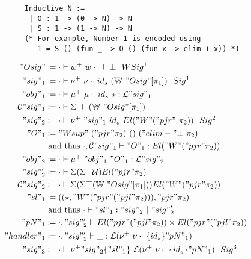 \begin{figure}
  \begin{minipage}{\linewidth}
    \begin{verbatim}
      Inductive N :=
       | O : 1 -> (0 -> N) -> N 
       | S : 1 -> (1 -> N) -> N
      (* For example, Number 1 is encoded using
         1 = S () (fun _ -> O () (fun x -> elim-⊥ x)) *)
    \end{verbatim}
  \end{minipage}

  \begin{minipage}[t]{0.4\linewidth}
  \small
\begin{align*}
  "Osig" &\coloneqq \goodWSig{\cdot}{w^+\ w\cdot\ \top\ \bot}{1} \\
  "sig"_1 &\coloneqq \goodSig{\cdot}{\nu^+ \ \nu\cdot \ {id_s} \ (\bW \ "Osig"[\pi_1])}{1}  \\
  "obj"_1 &\coloneqq \goodTerm{\cdot}{\mu^+ \ \mu\cdot \ {id_s} \ \star}{\cL"sig"_1}\\
  \cC"sig"_1 &\coloneqq \goodType{\cdot}{\Sigma \ \top \ (\bW \ "Osig"[\pi_1]) }{} \\
  "sig"_2 &\coloneqq  \goodSig{\cdot}{\nu^+ \ "sig"_1 \ {id_s} \ El ("W" ("pjr" \ \pi_2))}{2} \\ 
  "O"_1 &\coloneqq {"Wsup" \ ("pjr" \pi_2) \ () \ ("elim-"\bot \ \pi_2)}  \\ 
  & \text{ and thus }  \goodTerm{\cdot, \cC"sig"_1}{"O"_1}{El ("W" ("pjr" \pi_2))} \\
  "obj"_2 &\coloneqq \goodTerm{\cdot}{\mu^+ \ "obj"_1 \ "O"_1}{\cL"sig"_2} \\
  "sig"_2' &\coloneqq \goodType{\cdot}{\Sigma (\Sigma \top \cU)El ("pjr" \pi_2)}{} \\ 
  \cC"sig"_2 &\coloneqq \goodType{\cdot}{\Sigma (\Sigma \top (\bW \ "Osig"[\pi_1]))El ("W"("pjr" \pi_2)) }{} \\ 
  "sl"_1 &\coloneqq ((\star, "W" ("pjr" ("pjl" \pi_2)) ), "pjr" \pi_2) \\ 
  & \text{ and thus }  \goodSeal{\cdot}{"sl"_1}{"sig"_2}{"sig"_2'} \\
  "pN"_1 &\coloneqq \goodType{\cdot, "sig"_2'}{El ("pjr" ("pjl" \pi_2)) \times El ("pjr" ("pjl" \pi_2))}{} \\
  "handler"_1 &\coloneqq \goodTerm{\cdot, "sig"_2'}{\_}{\cL(\nu^+ \ \nu\cdot \ \{id_s\} "pN"_1)} \\
  "sig"_3 &\coloneqq \goodSig{\cdot}{\nu^+ "sig"_2 \{"sl"_1\} \ \cL(\nu^+ \ \nu\cdot \ \{id_s\} "pN"_1)}{3} \\ 

\end{align*}
\end{minipage}
\end{figure}
